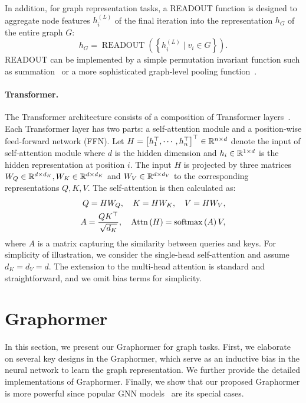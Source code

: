 \documentclass{article}
\newcommand{\attn}[1]{\mathrm{Attn}\rbr{#1}}
\newcommand{\softmax}[1]{\mathrm{softmax}\rbr{#1}}
\begin{document}
In addition, for graph representation tasks, a READOUT function is designed to aggregate node features $h_i^{(L)}$ of the final iteration into the representation $h_G$ of the entire graph $G$:
\begin{equation}
h_{G}=\operatorname{READOUT}\left(\left\{h_{i}^{(L)} \mid v_i \in G \right\}\right).
\end{equation}
READOUT can be implemented by a simple permutation invariant function such as summation~\cite{xu2018how} or a more sophisticated graph-level pooling function~\cite{baek2021accurate}.

\paragraph{Transformer.}
The Transformer architecture consists of a composition of Transformer layers~\cite{vaswani2017attention}. Each Transformer layer has two parts: a self-attention module and a position-wise feed-forward network (FFN). Let $H = \left[h_1^\top, \cdots, h_n^\top\right]^\top\in\mathbb{R}^{n\times d}$ denote the input of self-attention module where $d$ is the hidden dimension and $h_i\in\mathbb{R}^{1\times d}$ is the hidden representation at position $i$. The input $H$ is projected by three matrices $W_Q\in\mathbb{R}^{d\times d_K}, W_K\in\mathbb{R}^{d\times d_K}$ and $ W_V\in\mathbb{R}^{d\times d_V}$ to the corresponding representations $Q, K, V$. The self-attention is then calculated as:
\begin{align}
    Q = HW_Q,\quad K = HW_K,\quad V = HW_V,\label{eqn:attention-alpha}\\
    A = \frac{QK^\top}{\sqrt{d_K}}, \quad \attn{H} = \softmax{A}V,\label{eqn:attention-alpha2}
\end{align}
where $A$ is a matrix capturing the similarity between queries and keys. For simplicity of illustration, we consider the single-head self-attention and assume $d_K = d_V = d$. The extension to the multi-head attention is standard and straightforward, and we omit bias terms for simplicity.





\section{Graphormer}

In this section, we present our Graphormer for graph tasks. First, we elaborate on several key designs in the Graphormer, which serve as an inductive bias in the neural network to learn the graph representation. We further provide the detailed implementations of Graphormer. Finally, we show that our proposed Graphormer is more powerful since popular GNN models~\cite{kipf2016semi,xu2018how,hamilton2017inductive} are its special cases.
\end{document}
